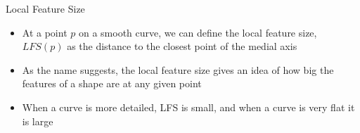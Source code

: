 \begin{frame}{Local Feature Size}
	\begin{itemize}
		\item At a point $p$ on a smooth curve, we can define the local feature size, $LFS(p)$ as the distance to the closest point of the medial axis
		\item As the name suggests, the local feature size gives an idea of how big the features of a shape are at any given point
		\item When a curve is more detailed, LFS is small, and when a curve is very flat it is large
	\end{itemize}
	
\end{frame}
